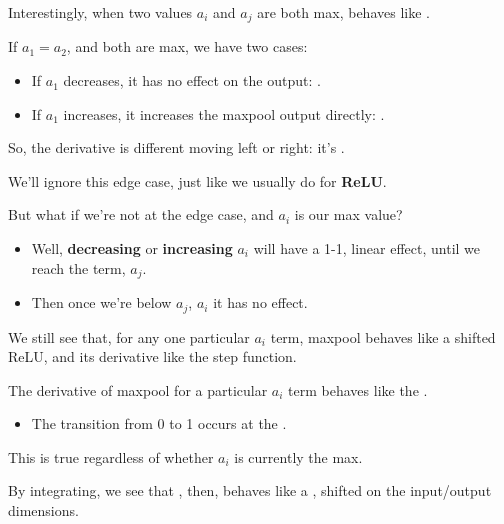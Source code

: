         Interestingly, when two values $a_i$ and $a_j$ are both max,  behaves like .

        If $a_1=a_2$, and both are max, we have two cases:

        \begin{itemize}
            \item If $a_1$ decreases, it has no effect on the output: .
            \item If $a_1$ increases, it increases the maxpool output directly: .
        \end{itemize}

        So, the derivative is different moving left or right: it's .

        We'll ignore this edge case, just like we usually do for \textbf{ReLU}.

        \subsecdiv

        But what if we're not at the edge case, and $a_i$ is our max value?

        \begin{itemize}
            \item Well, \textbf{decreasing} or \textbf{increasing} $a_i$ will have a 1-1, linear effect, until we reach the  term, $a_j$.
            \item Then once we're below $a_j$, $a_i$ it has no effect.
        \end{itemize}

         We still see that, for any one particular $a_i$ term, maxpool behaves like a shifted ReLU, and its derivative like the step function.\\

        
        \begin{kequation}
            The derivative of maxpool for a particular $a_i$ term behaves like the .
            
            \begin{itemize}
                \item The transition from 0 to 1 occurs at the .
            \end{itemize}

            This is true regardless of whether $a_i$ is currently the max.

            \subsecdiv

            By integrating, we see that , then, behaves like a , shifted on the input/output dimensions.
        \end{kequation}

